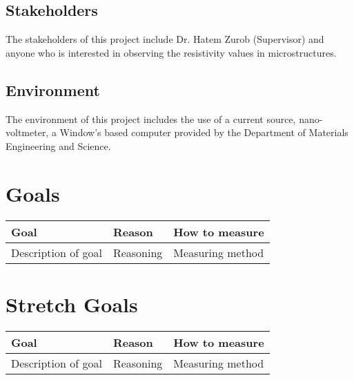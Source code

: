 \documentclass{article}
\begin{document}
\subsection{Stakeholders}
The stakeholders of this project include Dr. Hatem Zurob (Supervisor) and 
anyone who is interested in observing the resistivity values in microstructures.

\subsection{Environment}
The environment of this project includes the use of a current source, nano-voltmeter,
a Window's based computer provided by the Department of Materials Engineering and Science.

\section{Goals}

\begin{tabular}{ |p{3cm}||p{3cm}|p{4cm}|}
    \hline
    Goal& Reason & How to measure\\
    \hline
   Description of goal & Reasoning & Measuring method \\
    \hline
   \end{tabular}

\section{Stretch Goals}
\begin{tabular}{ |p{3cm}||p{3cm}|p{4cm}|}
    \hline
    Goal& Reason & How to measure\\
    \hline
   Description of goal & Reasoning & Measuring method \\
    \hline
   \end{tabular}
\end{document}
